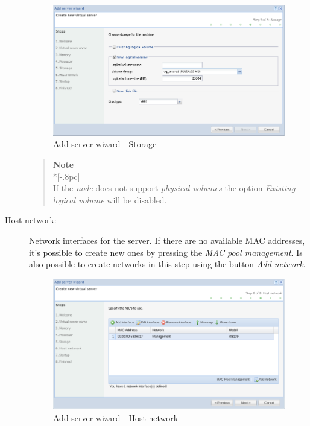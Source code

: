 \begin{description}
        \begin{figure}[H]
        		\begin{center}
	        	\includegraphics[scale=0.5]{screenshots/server_createwiz_storage.png}
	        	\caption{Add server wizard - Storage}
		        \label{fig:server_createwiz_storage}
        		\end{center}
		\end{figure}

		\begin{quote}
			{\large \bf Note} \\*[-.8pc]
			\underline{\hspace{6in}} \\
            If the \emph{node} does not support \emph{physical volumes} the option \emph{Existing logical volume} will be disabled.
		\end{quote}		
        
        
        \item[Host network:] Network interfaces for the server. If there are no available MAC addresses, it's possible to create new ones by pressing the \emph{MAC pool management}. Is also possible to create networks in this step using the button \emph{Add network}.
		\begin{figure}[H]
        		\begin{center}
	        	\includegraphics[scale=0.5]{screenshots/server_createwiz_hostnet.png}
	        	\caption{Add server wizard - Host network}
		        \label{fig:server_createwiz_hostnet}
        		\end{center}
		\end{figure}


\end{description}
